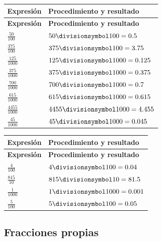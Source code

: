 \documentclass[spanish,letterpaper,oneside]{article}
\let\div\divisionsymbol
\begin{document}
{\small{}\renewcommand{\arraystretch}{1.25}
\begin{longtable}{|>{\raggedright\arraybackslash}p{}|>{\raggedright\arraybackslash}p{}|}\hline
\rowcolor{iiiepePale} \textbf{Expresión} & \textbf{Procedimiento y resultado} \\\hline
\endfirsthead
\hline
\rowcolor{iiiepePale} \textbf{Expresión} & \textbf{Procedimiento y resultado} \\\hline
\endhead
$\frac{50}{100}$ & $50\div 100=0.5$ \\\hline
$\frac{375}{100}$ & $375\div 100=3.75$ \\\hline
$\frac{125}{1000}$ & $125\div 1000=0.125$ \\\hline
$\frac{375}{1000}$ & $375\div 1000=0.375$ \\\hline
$\frac{700}{1000}$ & $700\div 1000=0.7$ \\\hline
$\frac{615}{1000}$ & $615\div 1000=0.615$ \\\hline
$\frac{4455}{1000}$ & $4455\div 1000=4.455$ \\\hline
$\frac{45}{1000}$ & $45\div 1000=0.045$ \\\hline
\end{longtable}}



{\small{}\renewcommand{\arraystretch}{1.25}
\begin{longtable}{|>{\raggedright\arraybackslash}p{}|>{\raggedright\arraybackslash}p{}|}\hline
\rowcolor{iiiepePale} \textbf{Expresión} & \textbf{Procedimiento y resultado} \\\hline
\endfirsthead
\hline
\rowcolor{iiiepePale} \textbf{Expresión} & \textbf{Procedimiento y resultado} \\\hline
\endhead
$\frac{4}{100}$ & $4\div 100=0.04$ \\\hline
$\frac{815}{10}$ & $815\div 10=81.5$ \\\hline
$\frac{1}{1000}$ & $1\div 1000=0.001$ \\\hline
$\frac{5}{100}$ & $5\div 100=0.05$ \\\hline
\end{longtable}}

\subsection*{Fracciones propias}
\end{document}
